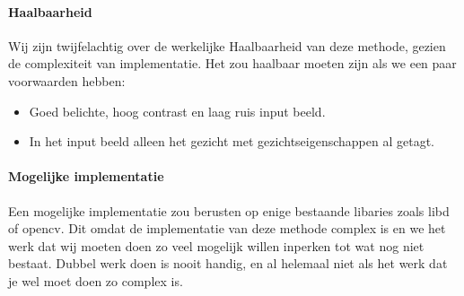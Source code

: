 \documentclass[11pt]{article}
\begin{document}
    \paragraph{Haalbaarheid}
    Wij zijn twijfelachtig over de werkelijke Haalbaarheid van deze methode, gezien de complexiteit van implementatie.
    Het zou haalbaar moeten zijn als we een paar voorwaarden hebben:
    \begin{itemize}
        \item Goed belichte, hoog contrast en laag ruis input beeld.
        \item In het input beeld alleen het gezicht met gezichtseigenschappen al getagt.
    \end{itemize}

    \paragraph{Mogelijke implementatie}
    Een mogelijke implementatie zou berusten op enige bestaande libaries zoals libd of opencv.
    Dit omdat de implementatie van deze methode complex is en we het werk dat wij moeten doen zo veel mogelijk willen inperken tot wat nog niet bestaat.
    Dubbel werk doen is nooit handig, en al helemaal niet als het werk dat je wel moet doen zo complex is.


    
\end{document}
